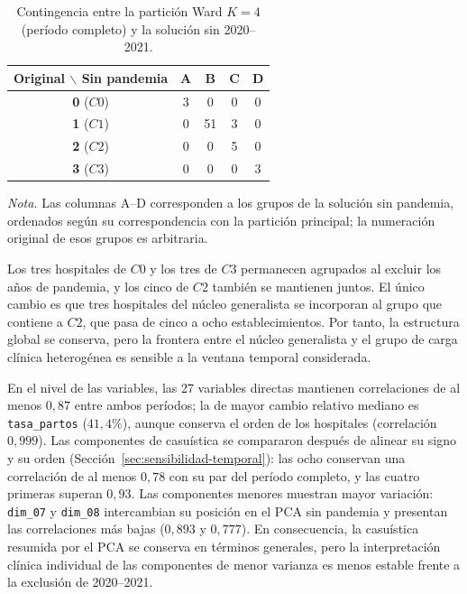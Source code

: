 \begin{table}[htbp]
\centering
\caption{Contingencia entre la partición Ward $K=4$ (período completo) y la solución sin 2020--2021.}
\label{tab:contingencia-temporal}
\begin{tabular}{c c c c c}
\toprule
\textbf{Original $\backslash$ Sin pandemia} & \textbf{A} & \textbf{B} & \textbf{C} & \textbf{D} \\
\midrule
\textbf{0} ($C0$) & 3 & 0 & 0 & 0 \\
\textbf{1} ($C1$) & 0 & 51 & 3 & 0 \\
\textbf{2} ($C2$) & 0 & 0 & 5 & 0 \\
\textbf{3} ($C3$) & 0 & 0 & 0 & 3 \\
\bottomrule
\end{tabular}
\par\smallskip
\begin{minipage}{\textwidth}
\normalsize\raggedright
\textit{Nota.} Las columnas A--D corresponden a los grupos de la solución sin
pandemia, ordenados según su correspondencia con la partición principal; la
numeración original de esos grupos es arbitraria.
\end{minipage}
\end{table}

Los tres hospitales de $C0$ y los tres de $C3$ permanecen agrupados al excluir los años de pandemia, y los cinco de $C2$ también se mantienen juntos. El único cambio es que tres hospitales del núcleo generalista se incorporan al grupo que contiene a $C2$, que pasa de cinco a ocho establecimientos. Por tanto, la estructura global se conserva, pero la frontera entre el núcleo generalista y el grupo de carga clínica heterogénea es sensible a la ventana temporal considerada.

En el nivel de las variables, las 27 variables directas mantienen correlaciones de al menos $0{,}87$ entre ambos períodos; la de mayor cambio relativo mediano es \texttt{tasa\_partos} ($41{,}4\%$), aunque conserva el orden de los hospitales (correlación $0{,}999$). Las componentes de casuística se compararon después de alinear su signo y su orden (Sección~\ref{sec:sensibilidad-temporal}): las ocho conservan una correlación de al menos $0{,}78$ con su par del período completo, y las cuatro primeras superan $0{,}93$. Las componentes menores muestran mayor variación: \texttt{dim\_07} y \texttt{dim\_08} intercambian su posición en el PCA sin pandemia y presentan las correlaciones más bajas ($0{,}893$ y $0{,}777$). En consecuencia, la casuística resumida por el PCA se conserva en términos generales, pero la interpretación clínica individual de las componentes de menor varianza es menos estable frente a la exclusión de 2020--2021.

